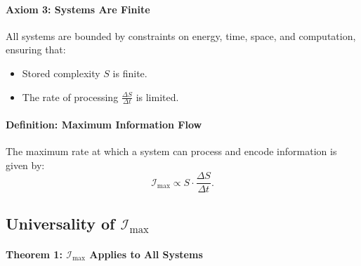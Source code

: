 \documentclass[12pt]{article}
\begin{document}
\paragraph{Axiom 3: Systems Are Finite}
All systems are bounded by constraints on energy, time, space, and computation, ensuring that:
\begin{itemize}
    \item Stored complexity \(S\) is finite.
    \item The rate of processing \(\frac{\Delta S}{\Delta t}\) is limited.
\end{itemize}

\paragraph{Definition: Maximum Information Flow}
The maximum rate at which a system can process and encode information is given by:
\[
\mathcal{I}_{\text{max}} \propto S \cdot \frac{\Delta S}{\Delta t}.
\]

\subsection{Universality of \(\mathcal{I}_{\text{max}}\)}

\paragraph{Theorem 1: \(\mathcal{I}_{\text{max}}\) Applies to All Systems}
\end{document}
